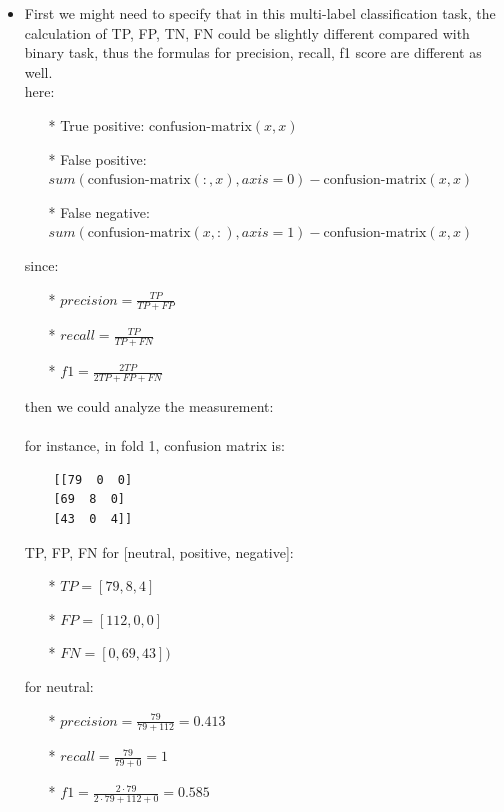 \documentclass[11pt]{article}
\providecommand{\tightlist}{%
      \setlength{\itemsep}{0pt}\setlength{\parskip}{0pt}}
\begin{document}
    \begin{itemize}
\tightlist
\item
  First we might need to specify that in this multi-label classification task, the calculation of TP, FP, TN, FN could be slightly different compared with binary task, thus the formulas for precision, recall, f1 score are different as well.\\
  
  here:
  \begin{itemize}
  	
  \item[*] True positive:  \(\text{confusion-matrix}(x, x)\)
  
  \item[*] False positive:  \(sum(\text{confusion-matrix}(:, x), axis = 0)-\text{confusion-matrix}(x, x)\)
  
  \item[*] False negative:  \(sum(\text{confusion-matrix}(x, :), axis = 1)-\text{confusion-matrix}(x, x)\)
  


\end{itemize}


 since:

\begin{itemize}
	\item[*] \(precision = \frac{TP}{TP + FP}\)
	\item[*] \(recall = \frac{TP}{TP + FN}\)
	\item[*] \(f1 = \frac{2 TP}{2 TP + FP + FN}\)
\end{itemize}


then we could analyze the measurement:
\\\\
for instance, in fold 1, confusion matrix is:

\begin{Verbatim} 
	[[79  0  0]
	[69  8  0]
	[43  0  4]] 
\end{Verbatim}

TP, FP, FN for [neutral, positive, negative]:
\begin{itemize}
	\item[*] \(TP = [79, 8, 4]\)
	\item[*] \(FP = [112, 0, 0]\) 
	\item[*] \(FN = [0, 69, 43])\)
\end{itemize}

for neutral:
\begin{itemize}
	\item[*] \(precision = \frac{79}{79 + 112} = 0.413\)
	\item[*] \(recall = \frac{79}{79 + 0} = 1\)
	\item[*] \(f1 = \frac{2 \cdot 79}{2 \cdot 79 + 112 + 0} = 0.585\)
\end{itemize}


\end{itemize}
\end{document}
